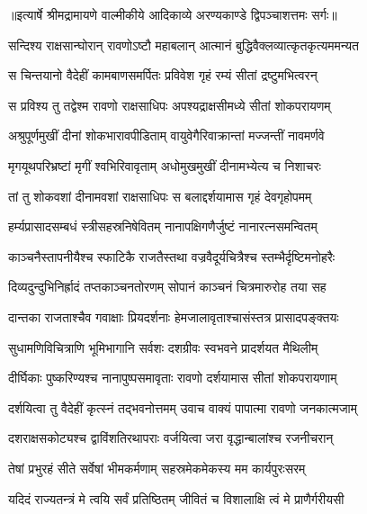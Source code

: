 {॥इत्यार्षे श्रीमद्रामायणे वाल्मीकीये आदिकाव्ये अरण्यकाण्डे द्विपञ्चाशत्तमः सर्गः॥}


\twolineshloka
{सन्दिश्य राक्षसान्घोरान् रावणोऽष्टौ महाबलान्}
{आत्मानं बुद्धिवैक्लव्यात्कृतकृत्यममन्यत} %

\twolineshloka
{स चिन्तयानो वैदेहीं कामबाणसमर्पितः}
{प्रविवेश गृहं रम्यं सीतां द्रष्टुमभित्वरन्} %

\twolineshloka
{स प्रविश्य तु तद्वेश्म रावणो राक्षसाधिपः}
{अपश्यद्राक्षसीमध्ये सीतां शोकपरायणम्} %

\twolineshloka
{अश्रुपूर्णमुखीं दीनां शोकभारावपीडिताम्}
{वायुवेगैरिवाक्रान्तां मज्जन्तीं नावमर्णवे} %

\twolineshloka
{मृगयूथपरिभ्रष्टां मृगीं श्वभिरिवावृताम्}
{अधोमुखमुखीं दीनामभ्येत्य च निशाचरः} %

\twolineshloka
{तां तु शोकवशां दीनामवशां राक्षसाधिपः}
{स बलाद्दर्शयामास गृहं देवगृहोपमम्} %

\twolineshloka
{हर्म्यप्रासादसम्बधं स्त्रीसहस्रनिषेवितम्}
{नानापक्षिगणैर्जुष्टं नानारत्नसमन्वितम्} %

\twolineshloka
{काञ्चनैस्तापनीयैश्च स्फाटिकै राजतैस्तथा}
{वज्रवैदूर्यचित्रैश्च स्तम्भैर्दृष्टिमनोहरैः} %

\twolineshloka
{दिव्यदुन्दुभिनिर्ह्रादं तप्तकाञ्चनतोरणम्}
{सोपानं काञ्चनं चित्रमारुरोह तया सह} %

\twolineshloka
{दान्तका राजताश्चैव गवाक्षाः प्रियदर्शनाः}
{हेमजालावृताश्चासंस्तत्र प्रासादपङ्क्तयः} %

\twolineshloka
{सुधामणिविचित्राणि भूमिभागानि सर्वशः}
{दशग्रीवः स्वभवने प्रादर्शयत मैथिलीम्} %

\twolineshloka
{दीर्घिकाः पुष्करिण्यश्च नानापुष्पसमावृताः}
{रावणो दर्शयामास सीतां शोकपरायणाम्} %

\twolineshloka
{दर्शयित्वा तु वैदेहीं कृत्स्नं तद्भवनोत्तमम्}
{उवाच वाक्यं पापात्मा रावणो जनकात्मजाम्} %

\twolineshloka
{दशराक्षसकोट्यश्च द्वाविंशतिरथापराः}
{वर्जयित्वा जरा वृद्धान्बालांश्च रजनीचरान्} %

\twolineshloka
{तेषां प्रभुरहं सीते सर्वेषां भीमकर्मणाम्}
{सहस्रमेकमेकस्य मम कार्यपुरःसरम्} %

\twolineshloka
{यदिदं राज्यतन्त्रं मे त्वयि सर्वं प्रतिष्ठितम्}
{जीवितं च विशालाक्षि त्वं मे प्राणैर्गरीयसी} %


